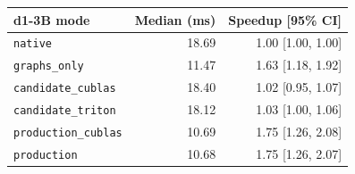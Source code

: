\begin{tabular}{lrr}
\toprule
d1-3B mode & Median (ms) & Speedup [95\% CI] \\
\midrule
\texttt{native} & 18.69 & 1.00 [1.00, 1.00] \\
\texttt{graphs\_only} & 11.47 & 1.63 [1.18, 1.92] \\
\texttt{candidate\_cublas} & 18.40 & 1.02 [0.95, 1.07] \\
\texttt{candidate\_triton} & 18.12 & 1.03 [1.00, 1.06] \\
\texttt{production\_cublas} & 10.69 & 1.75 [1.26, 2.08] \\
\texttt{production} & 10.68 & 1.75 [1.26, 2.07] \\
\bottomrule
\end{tabular}
